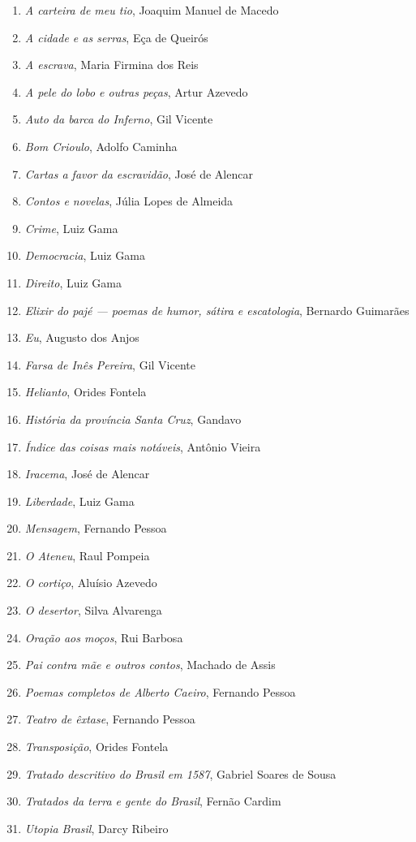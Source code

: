 \begin{enumerate}
\setlength\parskip{4.2pt}
\setlength\itemsep{-1.4mm}
\item \textit{A carteira de meu tio}, Joaquim Manuel de Macedo
\item \textit{A cidade e as serras}, Eça de Queirós
\item \textit{A escrava}, Maria Firmina dos Reis
\item \textit{A pele do lobo e outras peças}, Artur Azevedo
\item \textit{Auto da barca do Inferno}, Gil Vicente
\item \textit{Bom Crioulo}, Adolfo Caminha
\item \textit{Cartas a favor da escravidão}, José de Alencar
\item \textit{Contos e novelas}, Júlia Lopes de Almeida 
\item \textit{Crime}, Luiz Gama
\item \textit{Democracia}, Luiz Gama
\item \textit{Direito}, Luiz Gama
\item \textit{Elixir do pajé --- poemas de humor, sátira e escatologia}, Bernardo Guimarães
\item \textit{Eu}, Augusto dos Anjos
\item \textit{Farsa de Inês Pereira}, Gil Vicente
\item \textit{Helianto}, Orides Fontela
\item \textit{História da província Santa Cruz}, Gandavo
\item \textit{Índice das coisas mais notáveis}, Antônio Vieira
\item \textit{Iracema}, José de Alencar
\item \textit{Liberdade}, Luiz Gama
\item \textit{Mensagem}, Fernando Pessoa
\item \textit{O Ateneu}, Raul Pompeia
\item \textit{O cortiço}, Aluísio Azevedo
\item \textit{O desertor}, Silva Alvarenga
\item \textit{Oração aos moços}, Rui Barbosa
\item \textit{Pai contra mãe e outros contos}, Machado de Assis
\item \textit{Poemas completos de Alberto Caeiro}, Fernando Pessoa
\item \textit{Teatro de êxtase}, Fernando Pessoa
\item \textit{Transposição}, Orides Fontela
\item \textit{Tratado descritivo do Brasil em 1587}, Gabriel Soares de Sousa
\item \textit{Tratados da terra e gente do Brasil}, Fernão Cardim 
\item \textit{Utopia Brasil}, Darcy Ribeiro
\end{enumerate}

